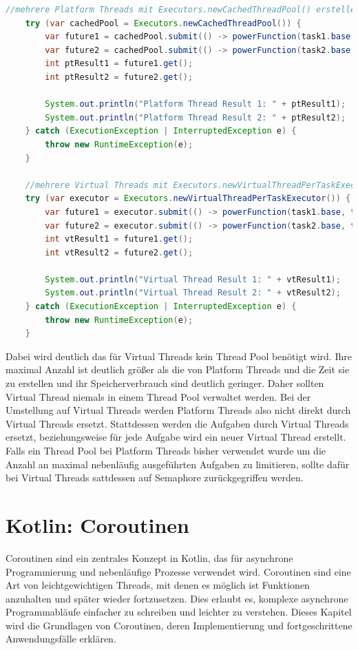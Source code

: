 \documentclass[fontsize=12pt,paper=a4,twoside=semi,parskip=half-,headsepline,headinclude]{scrreprt}
\begin{document}
\begin{lstlisting}[language=Java]
	//mehrere Platform Threads mit Executors.newCachedThreadPool() erstellen
	try (var cachedPool = Executors.newCachedThreadPool()) {
		var future1 = cachedPool.submit(() -> powerFunction(task1.base, task1.exponent));
		var future2 = cachedPool.submit(() -> powerFunction(task2.base, task2.exponent));
		int ptResult1 = future1.get();
		int ptResult2 = future2.get();
	
		System.out.println("Platform Thread Result 1: " + ptResult1);
		System.out.println("Platform Thread Result 2: " + ptResult2);
	} catch (ExecutionException | InterruptedException e) {
		throw new RuntimeException(e);
	}

	//mehrere Virtual Threads mit Executors.newVirtualThreadPerTaskExecutor() erstellen
	try (var executor = Executors.newVirtualThreadPerTaskExecutor()) {
		var future1 = executor.submit(() -> powerFunction(task1.base, task1.exponent));
		var future2 = executor.submit(() -> powerFunction(task2.base, task2.exponent));
		int vtResult1 = future1.get();
		int vtResult2 = future2.get();
	
		System.out.println("Virtual Thread Result 1: " + vtResult1);
		System.out.println("Virtual Thread Result 2: " + vtResult2);
	} catch (ExecutionException | InterruptedException e) {
		throw new RuntimeException(e);
	}
\end{lstlisting}

Dabei wird deutlich das für Virtual Threads kein Thread Pool benötigt wird. Ihre maximal Anzahl ist deutlich größer als die von Platform Threads und die Zeit sie zu erstellen und ihr Speicherverbrauch sind deutlich geringer. Daher sollten Virtual Thread niemals in einem Thread Pool verwaltet werden. Bei der Umstellung auf Virtual Threads werden Platform Threads also nicht direkt durch Virtual Threads ersetzt. Stattdessen werden die Aufgaben durch Virtual Threads ersetzt, beziehungsweise für jede Aufgabe wird ein neuer Virtual Thread erstellt. Falls ein Thread Pool bei Platform Threads bisher verwendet wurde um die Anzahl an maximal nebenläufig ausgeführten Aufgaben zu limitieren, sollte dafür bei Virtual Threads sattdessen auf Semaphore zurückgegriffen werden.

\newpage

\section{Kotlin: Coroutinen}

Coroutinen sind ein zentrales Konzept in Kotlin, das für asynchrone Programmierung und nebenläufige Prozesse verwendet wird. Coroutinen sind eine Art von leichtgewichtigen Threads, mit denen es möglich ist Funktionen anzuhalten und später wieder fortzusetzen. Dies erlaubt es, komplexe asynchrone Programmabläufe einfacher zu schreiben und leichter zu verstehen. Dieses Kapitel wird die Grundlagen von Coroutinen, deren Implementierung und fortgeschrittene Anwendungsfälle erklären.
\end{document}
